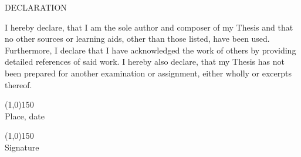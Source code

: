 \Large{ DECLARATION }

I hereby declare, that I am the sole author and composer of my Thesis and that no other sources or learning aids, other than those listed, have been used. Furthermore, I declare that I have acknowledged the work of others by providing detailed references of said work.
I hereby also declare, that my Thesis has not been prepared for another examination
or assignment, either wholly or excerpts thereof. 
\vspace{0.5cm}

\begin{minipage}[t]{0.45\textwidth}
\line(1,0){150}\\
Place, date	\\
\end{minipage}\hfill
\begin{minipage}[t]{0.45\textwidth}
\line(1,0){150}\\
Signature\\
\end{minipage}